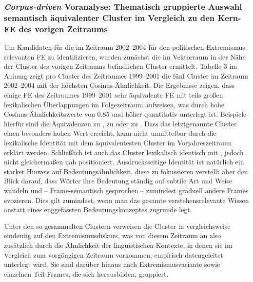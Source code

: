 \subsubsection{\texorpdfstring{\emph{Corpus-driven} Voranalyse: Thematisch gruppierte Auswahl semantisch äquivalenter Cluster im Vergleich zu den Kern-FE des vorigen Zeitraums}{Corpus-driven Voranalyse: Thematisch gruppierte Auswahl semantisch äquivalenter Cluster im Vergleich zu den Kern-FE des vorigen Zeitraums}}\label{corpus-driven-voranalyse-thematisch-gruppierte-auswahl-semantisch-aequivalenter-cluster-im-vergleich-zu-den-kern-fe-des-vorigen-zeitraums}

Um Kandidaten für die im Zeitraum 2002--2004 für den politischen Extremismus relevanten FE zu identifizieren, wurden zunächst die im Vektorraum in der Nähe der Cluster des vorigen Zeitraums befindlichen Cluster ermittelt. Tabelle 3 im Anhang zeigt pro Cluster des Zeitraumes 1999--2001 die fünf Cluster im Zeitraum 2002--2004 mit der höchsten Cosinus-Ähnlichkeit. Die Ergebnisse zeigen, dass einige FE des Zeitraumes 1999--2001 sehr äquivalente FE mit teils großen lexikalischen Überlappungen im Folgezeitraum aufweisen, was durch hohe Cosinus-Ähnlichkeitswerte von 0,85 und höher quantitativ unterlegt ist. Beispiele hierfür sind die Äquivalenzen  zu ,  zu  oder  zu . Dass das letztgenannte Cluster einen besonders hohen Wert erreicht, kann nicht unmittelbar durch die lexikalische Identität mit dem äquivalentesten Cluster im Vorjahreszeitraum erklärt werden. Schließlich ist auch das Cluster  lexikalisch identisch mit , jedoch nicht gleichermaßen nah positioniert. Ausdrucksseitige Identität ist natürlich ein starker Hinweis auf Bedeutungsähnlichkeit, diese zu fokussieren verstellt aber den Blick darauf, dass Wörter ihre Bedeutung ständig auf subtile Art und Weise wandeln und -- Frame-semantisch gesprochen -- zumindest graduell andere Frames evozieren. Dies gilt zumindest, wenn man das gesamte verstehensrelevante Wissen anstatt eines enggefassten Bedeutungskonzeptes zugrunde legt.

Unter den so gesammelten Clustern verweisen die Cluster in  vergleichsweise eindeutig auf den Extremismusdiskurs, was von diesem Zeitraum an also zusätzlich durch die Ähnlichkeit der linguistischen Kontexte, in denen sie im Vergleich zum vorgängigen Zeitraum vorkommen, empirisch-datengeleitet unterlegt wird. Sie sind darüber hinaus nach Extremismusvariante sowie einzelnen Teil-Frames, die sich herausbilden, gruppiert.

